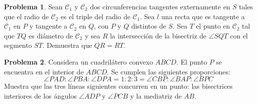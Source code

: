 \documentclass[11pt]{report}
\theoremstyle{definition}
\newtheorem{problema}{Problema}
\begin{document}
\begin{problema}
Sean $\mathcal{C}_1$ y $\mathcal{C}_2$ dos circunferencias tangentes externamente en 
$S$ tales que el radio de $\mathcal{C}_2$ es el triple del radio de $\mathcal{C}_1$. Sea 
$l$ una recta que es tangente a $\mathcal{C}_1$ en $P$ y tangente a $\mathcal{C}_2$ en $Q$,
con $P$ y $Q$ distintos de $S$. Sea $T$ el punto en $\mathcal{C}_2$ tal que $TQ$ es di\'ametro 
de $\mathcal{C}_2$ y sea $R$ la intersecci\'on de la bisectriz de $\angle SQT$ con el segmento 
$ST$. Demuestra que $QR = RT$.

\end{problema}

\begin{problema}
Considera un cuadrilátero convexo $ABCD$. El punto $P$ se encuentra en el interior de $ABCD$. Se cumplen las siguientes proporciones:
\[\angle PAD:\angle PBA:\angle DPA=1:2:3=\angle CBP:\angle BAP:\angle BPC\]
Muestra que las tres líneas siguientes concurren en un punto: las bisectrices interiores de los ángulos $\angle ADP$ y $\angle PCB$ y la mediatriz de $AB$. 

\end{problema}
\end{document}
